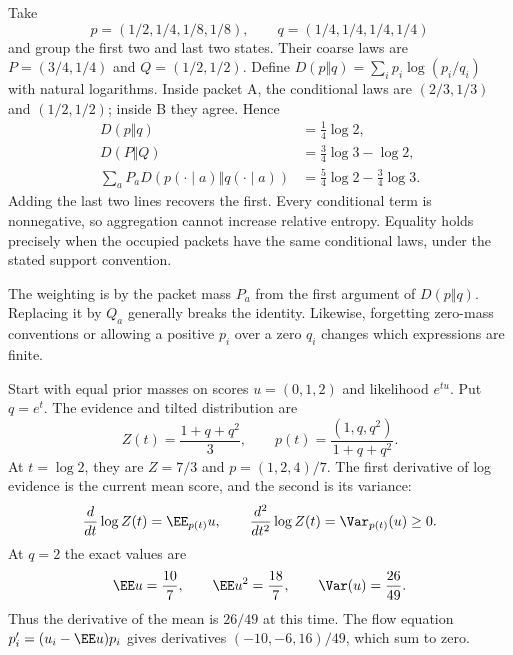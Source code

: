 Take
\[
p=(1/2,1/4,1/8,1/8),\qquad q=(1/4,1/4,1/4,1/4)
\]
and group the first two and last two states. Their coarse laws are $P=(3/4,1/4)$ and $Q=(1/2,1/2)$. Define $D(p\Vert q)=\sum_i p_i\log(p_i/q_i)$ with natural logarithms.
Inside packet A, the conditional laws are $(2/3,1/3)$ and $(1/2,1/2)$; inside B they agree. Hence
\[
\begin{aligned}
D(p\Vert q)&=\tfrac14\log2,\\
D(P\Vert Q)&=\tfrac34\log3-\log2,\\
\sum_aP_aD(p(\cdot\mid a)\Vert q(\cdot\mid a))
&=\tfrac54\log2-\tfrac34\log3.
\end{aligned}
\]
Adding the last two lines recovers the first. Every conditional term is nonnegative, so aggregation cannot increase relative entropy. Equality holds precisely when the occupied packets have the same conditional laws, under the stated support convention.

The weighting is by the packet mass $P_a$ from the first argument of $D(p\Vert q)$. Replacing it by $Q_a$ generally breaks the identity. Likewise, forgetting zero-mass conventions or allowing a positive $p_i$ over a zero $q_i$ changes which expressions are finite.

Start with equal prior masses on scores $u=(0,1,2)$ and likelihood $e^{tu}$. Put $q=e^t$. The evidence and tilted distribution are
\[
Z(t)=\frac{1+q+q^2}{3},\qquad
p(t)=\frac{(1,q,q^2)}{1+q+q^2}.
\]
At $t=\log2$, they are $Z=7/3$ and $p=(1,2,4)/7$.
The first derivative of log evidence is the current mean score, and the second is its variance:
\[
\frac{d}{dt}\log Z(t)=\EE_{p(t)}u,
\qquad
\frac{d^2}{dt^2}\log Z(t)=\Var_{p(t)}(u)\ge0.
\]
At $q=2$ the exact values are
\[
\EE u=\frac{10}{7},\qquad
\EE u^2=\frac{18}{7},\qquad
\Var(u)=\frac{26}{49}.
\]
Thus the derivative of the mean is $26/49$ at this time. The flow equation $p_i'=(u_i-\EE u)p_i$ gives derivatives $(-10,-6,16)/49$, which sum to zero.

